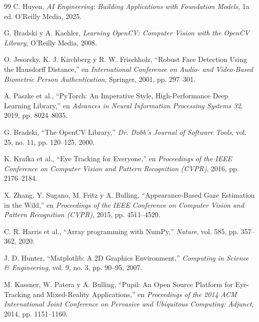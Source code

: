 \documentclass[twocolumn,10pt,letterpaper]{article}
\begin{document}
\begin{thebibliography}{99}
C. Huyen, \emph{AI Engineering: Building Applications with Foundation Models}, 1a ed. O'Reilly Media, 2025.

G. Bradski y A. Kaehler, \emph{Learning OpenCV: Computer Vision with the OpenCV Library}, O'Reilly Media, 2008.

O. Jesorsky, K. J. Kirchberg y R. W. Frischholz, ``Robust Face Detection Using the Hausdorff Distance,'' en \emph{International Conference on Audio- and Video-Based Biometric Person Authentication}, Springer, 2001, pp. 297--301.

A. Paszke et al., ``PyTorch: An Imperative Style, High-Performance Deep Learning Library,'' en \emph{Advances in Neural Information Processing Systems 32}, 2019, pp. 8024--8035.

G. Bradski, ``The OpenCV Library,'' \emph{Dr. Dobb's Journal of Software Tools}, vol. 25, no. 11, pp. 120--125, 2000.

K. Krafka et al., ``Eye Tracking for Everyone,'' en \emph{Proceedings of the IEEE Conference on Computer Vision and Pattern Recognition (CVPR)}, 2016, pp. 2176--2184.

X. Zhang, Y. Sugano, M. Fritz y A. Bulling, ``Appearance-Based Gaze Estimation in the Wild,'' en \emph{Proceedings of the IEEE Conference on Computer Vision and Pattern Recognition (CVPR)}, 2015, pp. 4511--4520.

C. R. Harris et al., ``Array programming with NumPy,'' \emph{Nature}, vol. 585, pp. 357--362, 2020.

J. D. Hunter, ``Matplotlib: A 2D Graphics Environment,'' \emph{Computing in Science \& Engineering}, vol. 9, no. 3, pp. 90--95, 2007.

M. Kassner, W. Patera y A. Bulling, ``Pupil: An Open Source Platform for Eye-Tracking and Mixed-Reality Applications,'' en \emph{Proceedings of the 2014 ACM International Joint Conference on Pervasive and Ubiquitous Computing: Adjunct}, 2014, pp. 1151--1160.
\end{thebibliography}
\end{document}

